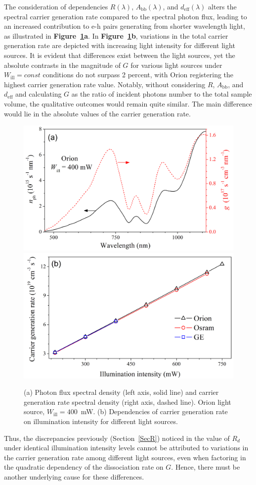 \documentclass{WileyMSP-template}
\begin{document}
The consideration of dependencies $R(\lambda)$, $A_\mathrm{bb}(\lambda)$, and $d_\mathrm{eff}(\lambda)$ alters
the spectral carrier generation rate compared to the spectral photon flux,
leading to an increased contribution to e-h pairs generating from shorter wavelength light,
as illustrated in \textbf{Figure~\ref{fig5}a}.
In \textbf{Figure~\ref{fig5}b}, variations in the total carrier generation rate are depicted with increasing light intensity for different light sources.
It is evident that differences exist between the light sources,
yet the absolute contrasts in the magnitude of $G$ for various light sources under $W_\mathrm{ill}=const$ conditions do not surpass 2 percent,
with Orion registering the highest carrier generation rate value.
Notably, without considering $R$, $A_\mathrm{bb}$, and $d_\mathrm{eff}$ and calculating $G$  as the ratio of incident photons number
to the total sample volume, the qualitative outcomes would remain quite similar. The main difference would lie in the absolute values of the carrier generation rate.

\begin{figure}
\centering
  \includegraphics[width=0.4\linewidth]{Fig5a.png}
  \includegraphics[width=0.4\linewidth]{Fig5b.png}
  \caption{
  (a) Photon flux spectral density (left axis, solid line) and carrier generation rate spectral density (right axis, dashed line).
  Orion light source, $W_\mathrm{ill}=400$~mW.
  (b) Dependencies of carrier generation rate on illumination intensity for different light sources.
  }
  \label{fig5}
\end{figure}

Thus, the discrepancies previously (Section~\ref{SecR}) noticed  in the value of $R_d$ under identical illumination intensity levels
cannot be attributed to variations in the carrier generation rate among different light sources,
even when factoring in the quadratic dependency of the dissociation rate on $G$.
Hence, there must be another underlying cause for these differences.
\end{document}
